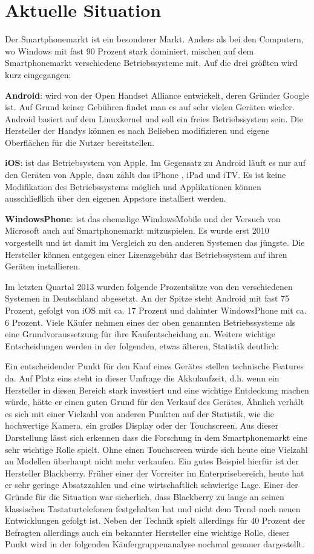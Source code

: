 \section{Aktuelle Situation}

Der Smartphonemarkt ist ein besonderer Markt. Anders als bei den Computern, wo Windows mit fast 90 Prozent stark dominiert, mischen auf dem Smartphonemarkt verschiedene Betriebssysteme mit. Auf die drei größten wird kurz eingegangen:

\textbf{Android}: wird von  der Open Handset Alliance entwickelt, deren Gründer Google ist. Auf Grund keiner Gebühren findet man es  auf sehr vielen Geräten wieder. Android basiert auf dem Linuxkernel und soll ein freies Betriebssystem sein. Die Hersteller der Handys können es nach Belieben modifizieren und eigene Oberflächen für die Nutzer bereitstellen.

\textbf{iOS}: ist das Betriebsystem von Apple. Im Gegensatz zu Android läuft es nur auf den Geräten von Apple, dazu zählt das iPhone , iPad und iTV. Es ist keine Modifikation des Betriebssystems möglich und Applikationen können ausschließlich über den eigenen Appstore installiert werden.
 
\textbf{WindowsPhone}:   ist das ehemalige WindowsMobile und der Versuch von Microsoft auch auf Smartphonemarkt mitzuspielen. Es wurde erst 2010 vorgestellt und ist damit im Vergleich zu den anderen Systemen das jüngste. Die Hersteller können entgegen einer Lizenzgebühr das Betriebssystem auf ihren Geräten installieren.


Im letzten Quartal 2013 wurden folgende Prozentsätze von den verschiedenen Systemen in Deutschland abgesetzt. An der Spitze steht Android mit fast 75 Prozent, gefolgt von iOS mit ca. 17 Prozent und dahinter WindowsPhone mit ca. 6 Prozent.
Viele Käufer nehmen eines der oben genannten Betriebssysteme als  eine Grundvoraussetzung für ihre Kaufentscheidung an. Weitere wichtige Entscheidungen werden in der folgenden, etwas älteren,  Statistik deutlich:


Ein entscheidender Punkt für den Kauf eines Gerätes stellen technische Features da. Auf Platz eins steht in dieser Umfrage die Akkulaufzeit, d.h. wenn ein Hersteller in diesen Bereich stark investiert und eine wichtige Entdeckung machen würde, hätte er einen guten Grund für den Verkauf des Gerätes. Ähnlich verhält es sich mit einer Vielzahl von anderen Punkten auf der Statistik, wie die hochwertige Kamera, ein großes Display oder der Touchscreen. Aus dieser Darstellung lässt sich erkennen dass die Forschung in dem Smartphonemarkt eine sehr wichtige Rolle spielt. Ohne einen Touchscreen würde sich heute eine Vielzahl an Modellen überhaupt nicht mehr verkaufen. Ein gutes Beispiel hierfür ist der Hersteller Blackberry. Früher einer der Vorreiter  im Enterprisebereich, heute hat er  sehr geringe Absatzzahlen und eine wirtschaftlich schwierige Lage. Einer der Gründe für die Situation war sicherlich, dass Blackberry zu lange an seinen klassischen Tastaturtelefonen festgehalten hat und nicht dem Trend nach neuen Entwicklungen gefolgt ist. Neben der Technik  spielt allerdings für 40 Prozent der Befragten allerdings auch ein bekannter Hersteller eine wichtige Rolle, dieser Punkt wird in der folgenden Käufergruppenanalyse nochmal genauer dargestellt.

